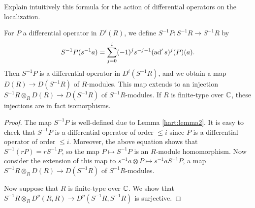 \begin{remark}
    Explain intuitively this formula for the action of differential operators on the
    localization. %
\end{remark}

\begin{corollary}
    For $P$ a differential operator in $D^i(R)$, we define $S^{-1}P:S^{-1}R\to S^{-1}R$ by
    \begin{equation}
        S^{-1}P(s^{-1}a) = \sum_{j=0}^i(-1)^js^{-j-1}(\operatorname{ad}'s)^j(P)(a).
        \label{eq:locdiff}
    \end{equation}
    Then $S^{-1}P$ is a differential operator in $D^i(S^{-1}R)$, and we obtain a map
    $D(R)\to D(S^{-1}R)$ of $R$-modules. This map extends to an injection
    $S^{-1}R\otimes_R D(R)\to D(S^{-1}R)$ of $S^{-1}R$-modules. If $R$ is finite-type
    over $\mathbb{C}$, these injections are in fact isomorphisms.
\end{corollary}
\begin{proof}
    The map $S^{-1}P$ is well-defined due to Lemma \ref{hart:lemma2}. It is easy to check
    that $S^{-1}P$ is a differential operator of order $\leqslant i$ since $P$ is a differential
    operator of order $\leqslant i$. Moreover, the above equation shows that
    $S^{-1}(rP)=r S^{-1}P$, so the map $P\mapsto S^{-1}P$ is an $R$-module homomorphism.
    Now consider the extension of this map to $s^{-1}a\otimes P\mapsto s^{-1}aS^{-1}P$, a map
    $S^{-1}R\otimes_R D(R)\to D(S^{-1}R)$ of $S^{-1}R$-modules.
    
    Now suppose that $R$ is finite-type over $\mathbb{C}$. We show that
    $S^{-1}R\otimes_R D^p(R,R)\to D^p(S^{-1}R,S^{-1}R)$ is surjective.
\end{proof}

